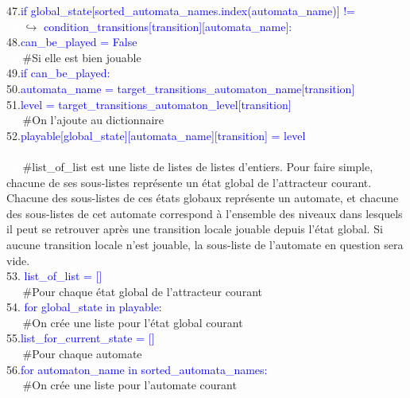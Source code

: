 \documentclass[12pt,a4paper]{article}
\begin{document}
{				47.\qquad\qquad\qquad\textcolor{blue}{if global\_state[sorted\_automata\_names.index(automata\_name)] != }\\
				\textcolor{white}{3ch}\qquad\qquad\qquad\qquad\qquad$\hookrightarrow$ \textcolor{blue}{condition\_transitions[transition][automata\_name]:}\\
					48.\qquad\qquad\qquad\qquad\textcolor{blue}{can\_be\_played = False}\\
			\textcolor{white}{3ch}\qquad\qquad\#Si elle est bien jouable\\
			49.\qquad\qquad\textcolor{blue}{if can\_be\_played:}\\
				50.\qquad\qquad\qquad\textcolor{blue}{automata\_name = target\_transitions\_automaton\_name[transition]}\\
				51.\qquad\qquad\qquad\textcolor{blue}{level = target\_transitions\_automaton\_level[transition]}\\
				\textcolor{white}{3ch}\qquad\qquad\qquad\#On l'ajoute au dictionnaire\\
				52.\qquad\qquad\qquad\textcolor{blue}{playable[global\_state][automata\_name][transition] = level}\\ \\
	\textcolor{white}{3ch}\#list\_of\_list est une liste de listes de listes d'entiers. Pour faire simple, chacune de ses sous-listes représente un état global de l'attracteur courant. Chacune des sous-listes de ces états 
	globaux représente un automate, et chacune des sous-listes de cet automate correspond à l'ensemble des niveaux dans lesquels il peut se retrouver après une transition locale jouable depuis l'état global. 
	Si aucune transition locale n'est jouable, la sous-liste de l'automate en question sera vide.\\
	53. \textcolor{blue}{list\_of\_list = []}\\
	\textcolor{white}{3ch}\#Pour chaque état global de l'attracteur courant\\
	54. \textcolor{blue}{for global\_state in playable:}\\
		\textcolor{white}{3ch}\qquad\#On crée une liste pour l'état global courant\\
		55.\qquad\textcolor{blue}{list\_for\_current\_state = []}\\
		\textcolor{white}{3ch}\qquad\#Pour chaque automate\\
		56.\qquad\textcolor{blue}{for automaton\_name in sorted\_automata\_names:}\\
			\textcolor{white}{3ch}\qquad\qquad\#On crée une liste pour l'automate courant\\
}
\end{document}
